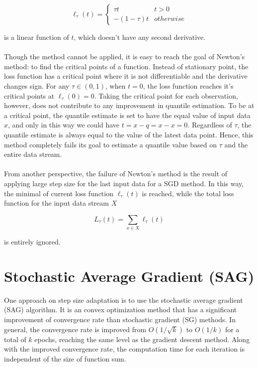 \begin{equation}
    \ell_\tau(t)= 
        \begin{cases}
            \tau t & t > 0\\
            -(1-\tau) t & otherwise
        \end{cases}
\end{equation}


is a linear function of $t$, which doesn't have any second derivative. 
\\\\
Though the method cannot be applied, it is easy to reach the goal of Newton's method: to find the critical points of a function. Instead of stationary point, the loss function has a critical point where it is not differentiable and the derivative changes sign. For any $\tau \in (0,1)$, when $t=0$, the loss function reaches it's critical points at $\ell_\tau(0) = 0$. Taking the critical point for each observation, however, does not contribute to any improvement in quantile estimation. To be at a critical point, the quantile estimate is set to have the equal value of input data $x$, and only in this way we could have $t = x-q = x-x = 0$. Regardless of $\tau$, the quantile estimate is always equal to the value of the latest data point. Hence, this method completely fails its goal to estimate a quantile value based on $\tau$ and the entire data stream.
\\\\
From another perspective, the failure of Newton's method is the result of applying large step size for the last input data for a SGD method. In this way, the minimal of current loss function $\ell_\tau(t)$ is reached, while the total loss function for the input data stream $X$

\begin{equation}
    L_{\tau}(t) = \sum_{x \in X} \ell_{\tau}(t)
\end{equation}

is entirely ignored.


\graphicspath{{Figures/Smooth_func/}{./}} 


\section{Stochastic Average Gradient (SAG)}
\label{sec: sag}
One approach on step size adaptation is to use the stochastic average gradient (SAG)\cite{schmidtMinimizingFiniteSums2016} algorithm. It is an convex optimization method that has a significant improvement of convergence rate than stochastic gradient (SG) methods. In general, the convergence rate is improved from $O(1/\sqrt{k})$ to $O(1/k)$ for a total of $k$ epochs, reaching the same level as the gradient descent method. Along with the improved convergence rate, the computation time for each iteration is independent of the size of function sum.

